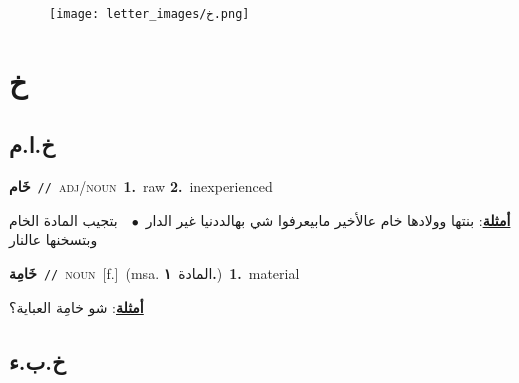 \documentclass[10pt,a4paper,twoside]{article} %
\begin{document}
\begin{figure*}[t!]\centering\texttt{[image: letter\_images/خ.png]}\end{figure*}
\color{white}

 \section*{\foreignlanguage{arabic}{خ}} 
 \begin{multicols}{2} 

%
\color{black}
\vspace{-3mm}
\subsection*{\color{blue}\foreignlanguage{arabic}{خ.ا.م}\color{blue}{ (ntws)}} 

{\setlength\topsep{0pt}\textbf{\foreignlanguage{arabic}{خَام}}\ {\color{gray}\texttt{//}\color{black}}\ \textsc{adj/noun}\ \textbf{1.}~raw  \textbf{2.}~inexperienced\  \begin{flushright}\color{gray}\foreignlanguage{arabic}{\textbf{\underline{\foreignlanguage{arabic}{أمثلة}}}: بنتها وولادها خام عالأخير مابيعرفوا شي بهالددنيا غير الدار\ $\bullet$\ \  بتجيب المادة الخام وبتسخنها عالنار}\end{flushright}\color{black}} \vspace{2mm}

{\setlength\topsep{0pt}\textbf{\foreignlanguage{arabic}{خَامِة}}\ {\color{gray}\texttt{//}\color{black}}\ \textsc{noun}\ [f.]\ \color{gray}(msa. \foreignlanguage{arabic}{المادة}~\foreignlanguage{arabic}{\textbf{١.}})\color{black}\ \textbf{1.}~material\  \begin{flushright}\color{gray}\foreignlanguage{arabic}{\textbf{\underline{\foreignlanguage{arabic}{أمثلة}}}: شو خامِة العباية؟}\end{flushright}\color{black}} \vspace{2mm}

\vspace{-3mm}
\subsection*{\color{blue}\foreignlanguage{arabic}{خ.ب.ء}\color{blue}{}} 


\end{multicols}
\end{document}
